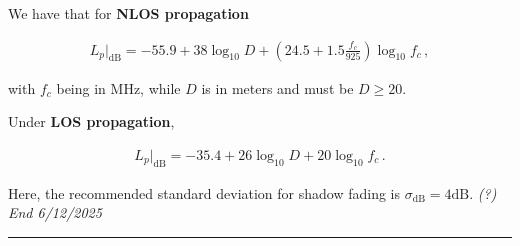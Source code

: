 \documentclass[a4paper, 12pt]{book}
\begin{document}
\newpage

We have that for \textbf{NLOS propagation}

\begin{align}
L_p|_{\text{dB}} = -55.9 + 38 \log_{10} D + \left( 24.5 + 1.5 \frac{f_c}{925} \right) \log_{10} f_c \,, \tag{3.19}
\end{align}

with $f_c$ being in MHz, while $D$ is in meters and must be $D \ge 20$.

Under \textbf{LOS propagation},

\begin{align}
L_p|_{\text{dB}} = -35.4 + 26 \log_{10} D + 20 \log_{10} f_c \,. \tag{3.20}
\end{align}

Here, the recommended standard deviation for shadow fading is $\sigma_{\text{dB}} = 4\text{dB}$.
\hfill \textit{(?) End 6/12/2025}

\noindent\rule{\textwidth}{1pt}
\end{document}
